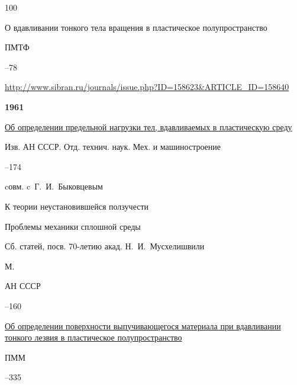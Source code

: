 \begin{thebibliography}{100}

\paper О вдавливании тонкого тела вращения в пластическое полупространство 

\jour ПМТФ



–78

\elink \url{http://www.sibran.ru/journals/issue.php?ID=158623&ARTICLE_ID=158640}





\item[] \centerline{\bf 1961}




\paper \href{https://zbmath.org/?q=an:0095.39302}{Об определении предельной нагрузки тел, вдавливаемых в пластическую среду}

\jour Изв. АН СССР. Отд. технич. наук. Мех. и машиностроение



–174 

\miscnote cовм. c~Г.~И.~Быковцевым





\paper К теории неустановившейся ползучести 

\inbook Проблемы механики сплошной среды

\bookinfo Сб. статей, посв. 70-летию акад. Н.~И.~Мусхелишвили

\publaddr М.

\publ АН СССР


–160




\paper \href{https://zbmath.org/?q=an:0099.40302}{Об определении поверхности выпучивающегося материала при вдавливании тонкого лезвия в пластическое полупространство} 

\jour ПММ 




–335



\end{thebibliography}
